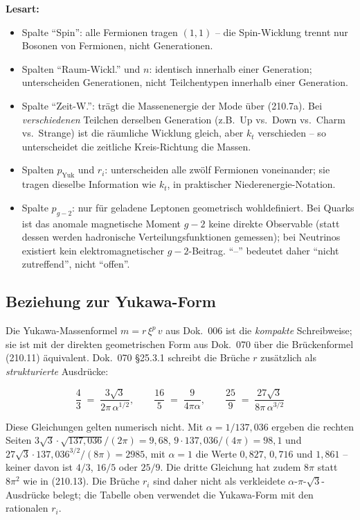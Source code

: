 \textbf{Lesart:}
\begin{itemize}
  \item Spalte \enquote{Spin}: alle Fermionen tragen $(1,1)$ -- die
        Spin-Wicklung trennt nur Bosonen von Fermionen, nicht
        Generationen.
  \item Spalten \enquote{Raum-Wickl.} und $n$: identisch innerhalb
        einer Generation; unterscheiden Generationen, nicht
        Teilchentypen innerhalb einer Generation.
  \item Spalte \enquote{Zeit-W.}: trägt die Massenenergie der Mode
        über (210.7a). Bei \emph{verschiedenen} Teilchen derselben
        Generation (z.B.\ Up vs.\ Down vs.\ Charm vs.\ Strange) ist
        die räumliche Wicklung gleich, aber $k_t$ verschieden -- so
        unterscheidet die zeitliche Kreis-Richtung die Massen.
  \item Spalten $p_{\text{Yuk}}$ und $r_i$: unterscheiden alle zwölf
        Fermionen voneinander; sie tragen dieselbe Information wie
        $k_t$, in praktischer Niederenergie-Notation.
  \item Spalte $p_{g\!-\!2}$: nur für geladene Leptonen geometrisch
        wohldefiniert. Bei Quarks ist das anomale magnetische Moment
        $g\!-\!2$ keine direkte Observable (statt dessen werden
        hadronische Verteilungsfunktionen gemessen); bei Neutrinos
        existiert kein elektromagnetischer $g\!-\!2$-Beitrag. \enquote{--}
        bedeutet daher \enquote{nicht zutreffend}, nicht \enquote{offen}.
\end{itemize}

\subsection*{Beziehung zur Yukawa-Form}

Die Yukawa-Massenformel $m = r\,\xi^p\,v$ aus Dok.~006 ist die
\emph{kompakte} Schreibweise; sie ist mit der direkten geometrischen
Form aus Dok.~070 über die Brückenformel (210.11) äquivalent.
Dok.~070 §25.3.1 schreibt die Brüche $r$ zusätzlich als
\emph{strukturierte} Ausdrücke:

\begin{equation}
  \frac{4}{3} \;=\; \frac{3\sqrt{3}}{2\pi\,\alpha^{1/2}},
  \qquad
  \frac{16}{5} \;=\; \frac{9}{4\pi\alpha},
  \qquad
  \frac{25}{9} \;=\; \frac{27\sqrt{3}}{8\pi\,\alpha^{3/2}}
  \tag{210.8}
\end{equation}

Diese Gleichungen gelten numerisch nicht. Mit $\alpha = 1/137{,}036$ ergeben die rechten Seiten $3\sqrt3\cdot\sqrt{137{,}036}/(2\pi) = 9{,}68$, $9\cdot137{,}036/(4\pi) = 98{,}1$ und $27\sqrt3\cdot137{,}036^{3/2}/(8\pi) = 2985$, mit $\alpha = 1$ die Werte $0{,}827$, $0{,}716$ und $1{,}861$ -- keiner davon ist $4/3$, $16/5$ oder $25/9$. Die dritte Gleichung hat zudem $8\pi$ statt $8\pi^2$ wie in (210.13). Die Brüche $r_i$ sind daher nicht als verkleidete $\alpha$-$\pi$-$\sqrt3$-Ausdrücke belegt; die Tabelle oben verwendet die Yukawa-Form mit den rationalen $r_i$.

